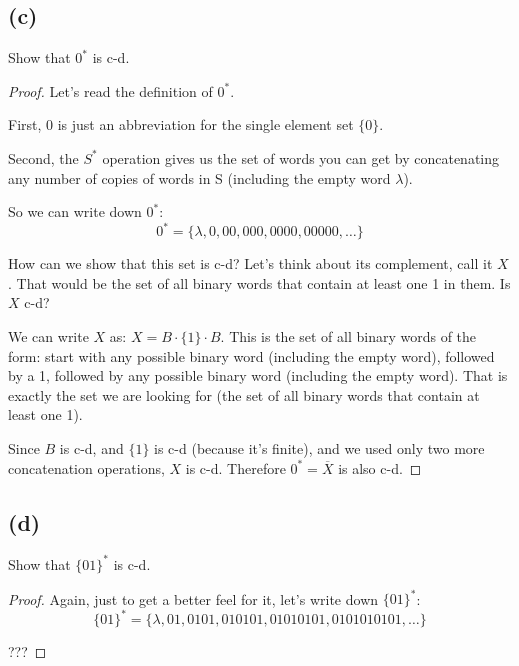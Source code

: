 \documentclass[14pt]{extarticle}
\begin{document}
\subsection{(c)}
Show that $0^*$ is c-d.
\begin{proof}
Let's read the definition of $0^*$. 

First, $0$ is just an abbreviation for the single element set $\{0\}$. 

Second, the $S^*$ operation gives us the set of words you can get by concatenating any number of copies of words in S (including the empty word $\lambda$).

So we can write down $0^*$:
$$
0^* = \{\lambda, 0, 00, 000, 0000, 00000, \ldots\}
$$

How can we show that this set is c-d? Let's think about its complement, call it $X$. That would be the set of all binary words that contain at least one 1 in them. Is $X$ c-d?

We can write $X$ as: $X = B \cdot \{1\} \cdot B$. This is the set of all binary words of the form: start with any possible binary word (including the empty word), followed by a 1, followed by any possible binary word (including the empty word). That is exactly the set we are looking for (the set of all binary words that contain at least one 1).

Since $B$ is c-d, and $\{1\}$ is c-d (because it's finite), and we used only two more concatenation operations, $X$ is c-d. Therefore $0^* = \overline{X}$ is also c-d.
\end{proof}

\subsection{(d)}
Show that $\{01\}^*$ is c-d.
\begin{proof}
Again, just to get a better feel for it, let's write down $\{01\}^*$:
$$
\{01\}^* = \{\lambda, 01, 0101, 010101, 01010101, 0101010101, \ldots\}
$$

???
\end{proof}
\end{document}

